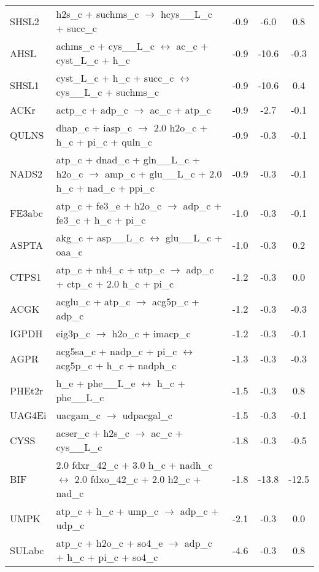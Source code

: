 \begin{longtable}{lp{}ccc}
SHSL2	&	h2s\_c + suchms\_c $\rightarrow$ hcys\_\_L\_c + succ\_c	&	-0.9	&	-6.0	&	0.8	\\
AHSL	&	achms\_c + cys\_\_L\_c $\leftrightarrow$ ac\_c + cyst\_L\_c + h\_c	&	-0.9	&	-10.6	&	-0.3	\\
SHSL1	&	cyst\_L\_c + h\_c + succ\_c $\leftrightarrow$ cys\_\_L\_c + suchms\_c	&	-0.9	&	-10.6	&	0.4	\\
ACKr	&	actp\_c + adp\_c $\rightarrow$ ac\_c + atp\_c	&	-0.9	&	-2.7	&	-0.1	\\
QULNS	&	dhap\_c + iasp\_c $\rightarrow$ 2.0 h2o\_c + h\_c + pi\_c + quln\_c	&	-0.9	&	-0.3	&	-0.1	\\
NADS2	&	atp\_c + dnad\_c + gln\_\_L\_c + h2o\_c $\rightarrow$ amp\_c + glu\_\_L\_c + 2.0 h\_c + nad\_c + ppi\_c	&	-0.9	&	-0.3	&	-0.1	\\
FE3abc	&	atp\_c + fe3\_e + h2o\_c $\rightarrow$ adp\_c + fe3\_c + h\_c + pi\_c	&	-1.0	&	-0.3	&	-0.1	\\
ASPTA	&	akg\_c + asp\_\_L\_c $\leftrightarrow$ glu\_\_L\_c + oaa\_c	&	-1.0	&	-0.3	&	0.2	\\
CTPS1	&	atp\_c + nh4\_c + utp\_c $\rightarrow$ adp\_c + ctp\_c + 2.0 h\_c + pi\_c	&	-1.2	&	-0.3	&	0.0	\\
ACGK	&	acglu\_c + atp\_c $\rightarrow$ acg5p\_c + adp\_c	&	-1.2	&	-0.3	&	-0.3	\\
IGPDH	&	eig3p\_c $\rightarrow$ h2o\_c + imacp\_c	&	-1.2	&	-0.3	&	-0.1	\\
AGPR	&	acg5sa\_c + nadp\_c + pi\_c $\leftrightarrow$ acg5p\_c + h\_c + nadph\_c	&	-1.3	&	-0.3	&	-0.3	\\
PHEt2r	&	h\_e + phe\_\_L\_e $\leftrightarrow$ h\_c + phe\_\_L\_c	&	-1.5	&	-0.3	&	0.8	\\
UAG4Ei	&	uacgam\_c $\rightarrow$ udpacgal\_c	&	-1.5	&	-0.3	&	-0.1	\\
CYSS	&	acser\_c + h2s\_c $\rightarrow$ ac\_c + cys\_\_L\_c	&	-1.8	&	-0.3	&	-0.5	\\
BIF	&	2.0 fdxr\_42\_c + 3.0 h\_c + nadh\_c $\leftrightarrow$ 2.0 fdxo\_42\_c + 2.0 h2\_c + nad\_c	&	-1.8	&	-13.8	&	-12.5	\\
UMPK	&	atp\_c + h\_c + ump\_c $\rightarrow$ adp\_c + udp\_c	&	-2.1	&	-0.3	&	0.0	\\
SULabc	&	atp\_c + h2o\_c + so4\_e $\rightarrow$ adp\_c + h\_c + pi\_c + so4\_c	&	-4.6	&	-0.3	&	0.8	\\
\end{longtable}
\normalsize

